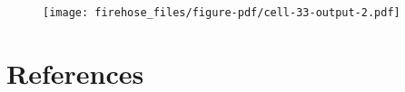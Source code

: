 \documentclass[
  letterpaper,
  DIV=11,
  numbers=noendperiod]{scrreprt}
\newlength{\cslhangindent}
\newlength{\cslentryspacingunit} %
\newenvironment{CSLReferences}[2] %
 {%
  \setlength{\parindent}{0pt}
  \ifodd #1
  \let\oldpar\par
  \def\par{\hangindent=\cslhangindent\oldpar}
  \fi
  \setlength{\parskip}{#2\cslentryspacingunit}
 }%
 {}
\begin{document}
\begin{figure}[H]

{\centering \texttt{[image: firehose\_files/figure-pdf/cell-33-output-2.pdf]}

}

\end{figure}


\hypertarget{references}{%
\chapter*{References}\label{references}}


\hypertarget{refs}{}
\begin{CSLReferences}{0}{0}
\end{CSLReferences}
\end{document}
